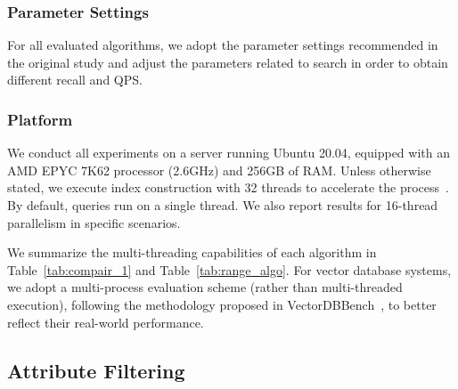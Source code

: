 \documentclass[sigconf, nonacm]{acmart}
\begin{document}
	\subsubsection{Parameter Settings}
	
	For all evaluated algorithms, we adopt the parameter settings recommended in the original study and adjust the parameters related to search in order to obtain different recall and QPS.
	
	
	
	\subsubsection{Platform}
	
	
	We conduct all experiments on a server running Ubuntu 20.04, equipped with an AMD EPYC 7K62 processor (2.6GHz) and 256GB of RAM. Unless otherwise stated, we execute index construction with 32 threads to accelerate the process~\cite{benchmarkindex}. By default, queries run on a single thread. We also report results for 16-thread parallelism in specific scenarios.
	
	We summarize the multi-threading capabilities of each algorithm in Table~\ref{tab:compair_1} and Table~\ref{tab:range_algo}. For vector database systems, we adopt a multi-process evaluation scheme (rather than multi-threaded execution), following the methodology proposed in VectorDBBench~\cite{VectorDBBench}, to better reflect their real-world performance.
	
	
	
	\subsection{Attribute Filtering}
	
	
\end{document}
